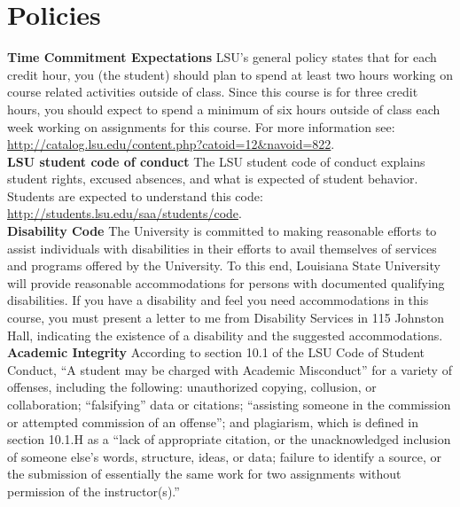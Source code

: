 \documentclass[11pt,article,oneside]{memoir}
\begin{document}
\clearpage

\section{Policies}

\noindent \textbf{Time Commitment Expectations}
LSU's general policy states that for each credit hour, you (the student) should plan to
spend at least two hours working on course related activities outside of class. Since this course is for three credit hours, you should expect to spend a minimum of six hours outside of class each week working on assignments for this course. For more information see: 
\url{http://catalog.lsu.edu/content.php?catoid=12&navoid=822}.\\

\noindent \textbf{LSU student code of conduct}
The LSU student code of conduct explains student rights, excused absences, and what is expected of student behavior. Students are expected to understand this code:  \url{http://students.lsu.edu/saa/students/code}.\\ %

\noindent \textbf{Disability Code}
The University is committed to making reasonable efforts to assist individuals with disabilities in
their efforts to avail themselves of services and programs offered by the University. To this end,
Louisiana State University will provide reasonable accommodations for persons with
documented qualifying disabilities. If you have a disability and feel you need accommodations in
this course, you must present a letter to me from Disability Services in 115 Johnston Hall,
indicating the existence of a disability and the suggested accommodations.\\

\noindent \textbf{Academic Integrity}
According to section 10.1 of the LSU Code of Student Conduct, ``A student may be charged with Academic Misconduct'' for a variety of offenses, including the following: unauthorized copying, collusion, or collaboration; ``falsifying'' data or citations; ``assisting someone in the commission or attempted commission of an offense''; and plagiarism, which is defined in section 10.1.H as a ``lack of appropriate citation, or the unacknowledged inclusion of someone else's words, structure, ideas, or data; failure to identify a source, or the submission of essentially the same work for two assignments without permission of the instructor(s).''\\
\end{document}
